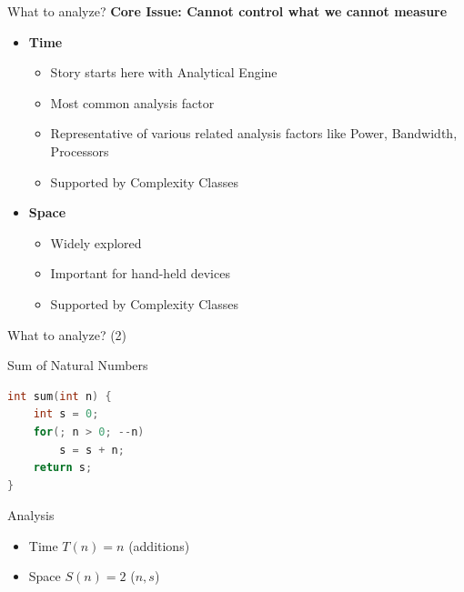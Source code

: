 \documentclass[aspectratio=169, xcolor=dvipsnames]{beamer}
\begin{document}
\begin{frame}{What to analyze?}
    \textbf{Core Issue: Cannot control what we cannot measure}
    \begin{block}{}
        \begin{itemize}[<+->]
            \item \textbf{Time}
            \begin{itemize}[<+->]
                \item Story starts here with Analytical Engine
                \item Most common analysis factor
                \item Representative of various related analysis factors like Power, Bandwidth, Processors
                \item Supported by Complexity Classes
            \end{itemize}
            \item \textbf{Space}
            \begin{itemize}[<+->]
                \item Widely explored
                \item Important for hand-held devices
                \item Supported by Complexity Classes
            \end{itemize}
        \end{itemize}
    \end{block}
\end{frame}

\begin{frame}[fragile]{What to analyze? (2)}
    \begin{exampleblock}{Sum of Natural Numbers}
\begin{lstlisting}[language=C++]
int sum(int n) {
    int s = 0;
    for(; n > 0; --n)
        s = s + n;
    return s;
}
\end{lstlisting}
    \end{exampleblock}
    \begin{alertblock}{Analysis}
        \begin{itemize}[<+->]
            \item Time $T(n) = n$ (additions)
            \item Space $S(n) = 2$ ($n, s$)
        \end{itemize}
    \end{alertblock}
\end{frame}
\end{document}
